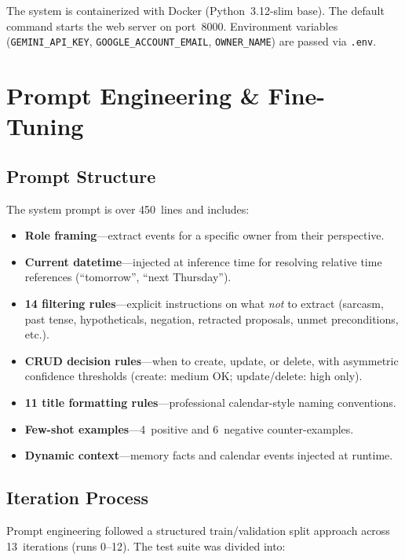 \documentclass[12pt]{article}
\begin{document}
The system is containerized with Docker (Python~3.12-slim base). The
default command starts the web server on port~8000. Environment variables
(\texttt{GEMINI\_API\_KEY}, \texttt{GOOGLE\_ACCOUNT\_EMAIL},
\texttt{OWNER\_NAME}) are passed via \texttt{.env}.

\section{Prompt Engineering \& Fine-Tuning}

\subsection{Prompt Structure}

The system prompt is over 450~lines and includes:

\begin{itemize}
    \item \textbf{Role framing}---extract events for a specific owner from
          their perspective.
    \item \textbf{Current datetime}---injected at inference time for
          resolving relative time references (``tomorrow'', ``next Thursday'').
    \item \textbf{14 filtering rules}---explicit instructions on what
          \emph{not} to extract (sarcasm, past tense, hypotheticals,
          negation, retracted proposals, unmet preconditions, etc.).
    \item \textbf{CRUD decision rules}---when to create, update, or delete,
          with asymmetric confidence thresholds (create: medium OK;
          update/delete: high only).
    \item \textbf{11 title formatting rules}---professional calendar-style
          naming conventions.
    \item \textbf{Few-shot examples}---4~positive and 6~negative
          counter-examples.
    \item \textbf{Dynamic context}---memory facts and calendar events
          injected at runtime.
\end{itemize}

\subsection{Iteration Process}

Prompt engineering followed a structured train/validation split approach
across 13~iterations (runs 0--12). The test suite was divided into:
\end{document}
